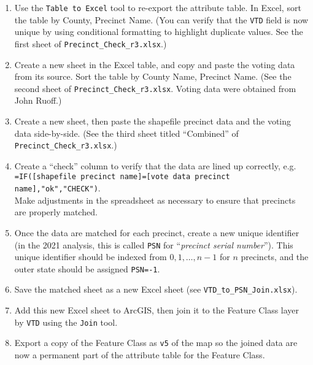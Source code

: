 \documentclass[11pt]{article}
\begin{document}
\begin{enumerate}
\item Use the \verb|Table to Excel| tool to re-export the attribute table. In Excel, sort the table by County, Precinct Name. (You can verify that the \verb|VTD| field is now unique by using conditional formatting to highlight duplicate values. See the first sheet of \verb|Precinct_Check_r3.xlsx|.)

\item Create a new sheet in the Excel table, and copy and paste the voting data from its source. Sort the table by County Name, Precinct Name. (See the second sheet of \verb|Precinct_Check_r3.xlsx|. Voting data were obtained from John Ruoff.)

\item Create a new sheet, then paste the shapefile precinct data and the voting data side-by-side. (See the third sheet titled ``Combined'' of \verb|Precinct_Check_r3.xlsx|.)

\item Create a ``check'' column to verify that the data are lined up correctly, e.g.\\
\verb|=IF([shapefile precinct name]=[vote data precinct name],"ok","CHECK")|.\\
Make adjustments in the spreadsheet as necessary to ensure that precincts are properly matched.

\item Once the data are matched for each precinct, create a new unique identifier (in the 2021 analysis, this is called \verb|PSN| for ``\textit{precinct serial number}''). This unique identifier should be indexed from $0, 1,\dots,n-1$ for $n$ precincts, and the outer state should be assigned \verb|PSN=-1|.

\item Save the matched sheet as a new Excel sheet (see \verb|VTD_to_PSN_Join.xlsx|).

\item Add this new Excel sheet to ArcGIS, then join it to the Feature Class layer by \verb|VTD| using the \verb|Join| tool. 

\item Export a copy of the Feature Class as \verb|v5| of the map so the joined data are now a permanent part of the attribute table for the Feature Class.
\end{enumerate}
\end{document}
